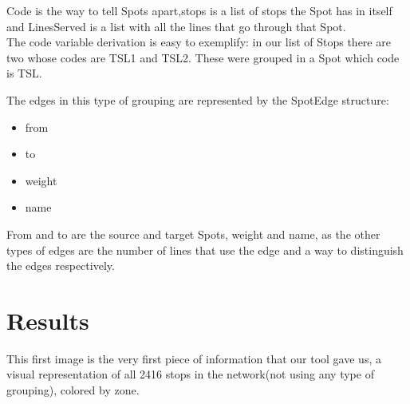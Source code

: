 \documentclass[12pt]{article}
\begin{document}
\begin{multicols}{2}
Code is the way to tell Spots apart,stops is a list of stops the Spot has in itself and LinesServed is a list with all the lines that go through that Spot.\\
The code variable derivation is easy to exemplify: in our list of Stops there are two whose codes are TSL1 and TSL2. These were grouped in a Spot which code is TSL.

The edges in this type of grouping are represented by the SpotEdge structure:
\begin{itemize}
\item from
\item to
\item weight
\item name
\end{itemize}

From and to are the source and target Spots, weight and name, as the other types of edges are the number of lines that use the edge and a way to distinguish the edges respectively.
	
\section{Results}
	This first image is the very first piece of information that our tool gave us, a visual representation of all 2416 stops in the network(not using any type of grouping), colored by zone.\\


\end{multicols}
\end{document}
